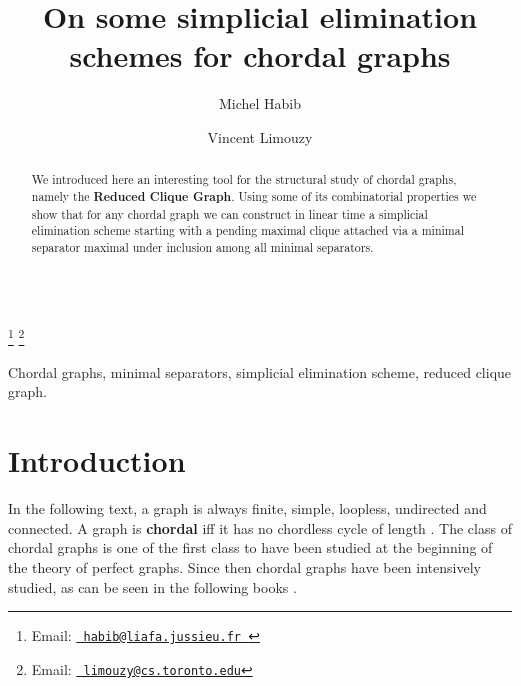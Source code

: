 \documentclass{endm}
\begin{document}
\begin{verbatim}\end{verbatim}\vspace{2.5cm}

\begin{frontmatter}

\title{On some simplicial elimination schemes for chordal graphs}


\author{Michel Habib }
\address{LIAFA, CNRS and Universit\'e Paris Diderot - Paris 7, France}

\author{Vincent Limouzy }
\address{Dept. of Computer Science, University of Toronto, Canada}

\thanks[myemail]{Email:
   \href{mailto:habib@liafa.jussieu.fr} {\texttt{\normalshape
  habib@liafa.jussieu.fr }}} \thanks[coemail]{Email:
   \href{mailto:limouzy@cs.toronto.edu} {\texttt{\normalshape
   limouzy@cs.toronto.edu}}}



\begin{abstract}
We introduced here an interesting tool for the structural study of chordal graphs, namely the \textbf{Reduced Clique Graph}. Using some of its  combinatorial properties we 
show  that  for any chordal graph we can construct in linear time a simplicial  elimination scheme starting with a pending maximal clique attached via  a minimal separator  maximal under inclusion among all minimal separators.
\end{abstract}

\begin{keyword}
Chordal graphs, minimal separators, simplicial elimination scheme, reduced clique graph.
\end{keyword}

\end{frontmatter}


\section{Introduction}\label{intro}
In the following text, a graph is always finite, simple, loopless, undirected and connected. A graph is \textbf{chordal} iff it has no chordless cycle of length .
The class of chordal graphs is one of the first class to have been studied at the beginning of the theory of perfect graphs. Since then chordal graphs have been intensively studied, as can be seen in the following books \cite{Golumbic80,BLS99}.
\end{document}
